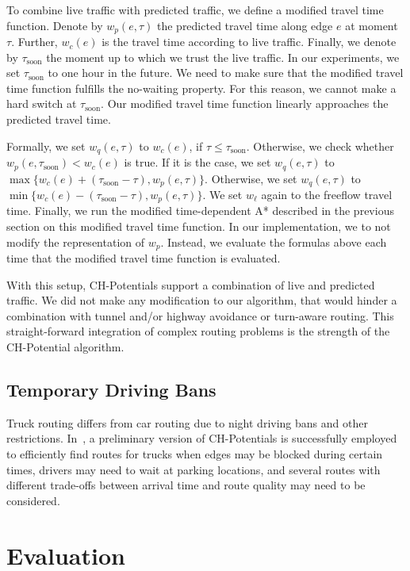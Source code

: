 \documentclass[letterpaper]{article} %
\begin{document}
To combine live traffic with predicted traffic, we define a modified travel time function.
Denote by $w_p(e,\tau)$ the predicted travel time along edge $e$ at moment $\tau$.
Further, $w_c(e)$ is the travel time according to live traffic.
Finally, we denote by $\tau_{\mathrm{soon}}$ the moment up to which we trust the live traffic.
In our experiments, we set $\tau_{\mathrm{soon}}$ to one hour in the future.
We need to make sure that the modified travel time function fulfills the no-waiting property.
For this reason, we cannot make a hard switch at $\tau_{\mathrm{soon}}$.
Our modified travel time function linearly approaches the predicted travel time. %

Formally, we set $w_q(e,\tau)$ to $w_c(e)$, if $\tau \leq \tau_{\mathrm{soon}}$.
Otherwise, we check whether $w_p(e,\tau_{\mathrm{soon}}) < w_c(e)$ is true.
If it is the case, we set $w_q(e,\tau)$ to $\max\{w_c(e)+(\tau_{\mathrm{soon}}-\tau), w_p(e,\tau)\}$.
Otherwise, we set $w_q(e,\tau)$ to $\min\{w_c(e)-(\tau_{\mathrm{soon}}-\tau), w_p(e,\tau)\}$.
We set $w_\ell$ again to the freeflow travel time.
Finally, we run the modified time-dependent A* described in the previous section on this modified travel time function.
In our implementation, we to not modify the representation of $w_p$.
Instead, we evaluate the formulas above each time that the modified travel time function is evaluated.

With this setup, CH-Potentials support a combination of live and predicted traffic.
We did not make any modification to our algorithm, that would hinder a combination with tunnel and/or highway avoidance or turn-aware routing.
This straight-forward integration of complex routing problems is the strength of the CH-Potential algorithm.

\subsection{Temporary Driving Bans}

Truck routing differs from car routing due to night driving bans and other restrictions.
In~\cite{kswz-erptd-20}, a preliminary version of CH-Potentials is successfully employed to efficiently find routes for trucks when edges may be blocked during certain times, drivers may need to wait at parking locations, and several routes with different trade-offs between arrival time and route quality may need to be considered.

\section{Evaluation}
\end{document}
